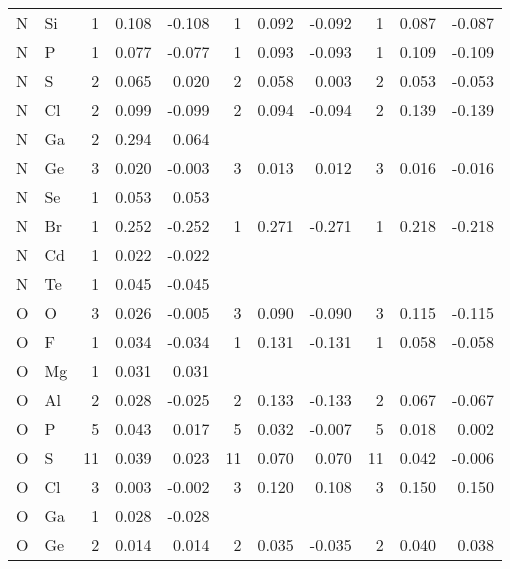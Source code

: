 \begin{table}
\begin{center}
\begin{tabular}{llrrrrrrrrr}
  N &  Si &   1 &    0.108 &   -0.108 &   1 &    0.092 &   -0.092 &   1 &    0.087 &   -0.087 \\
  N &   P &   1 &    0.077 &   -0.077 &   1 &    0.093 &   -0.093 &   1 &    0.109 &   -0.109 \\
  N &   S &   2 &    0.065 &    0.020 &   2 &    0.058 &    0.003 &   2 &    0.053 &   -0.053 \\
  N &  Cl &   2 &    0.099 &   -0.099 &   2 &    0.094 &   -0.094 &   2 &    0.139 &   -0.139 \\
  N &  Ga &   2 &    0.294 &    0.064 &     &          &          &     &          &          \\
  N &  Ge &   3 &    0.020 &   -0.003 &   3 &    0.013 &    0.012 &   3 &    0.016 &   -0.016 \\
  N &  Se &   1 &    0.053 &    0.053 &     &          &          &     &          &          \\
  N &  Br &   1 &    0.252 &   -0.252 &   1 &    0.271 &   -0.271 &   1 &    0.218 &   -0.218 \\
  N &  Cd &   1 &    0.022 &   -0.022 &     &          &          &     &          &          \\
  N &  Te &   1 &    0.045 &   -0.045 &     &          &          &     &          &          \\
  O &   O &   3 &    0.026 &   -0.005 &   3 &    0.090 &   -0.090 &   3 &    0.115 &   -0.115 \\
  O &   F &   1 &    0.034 &   -0.034 &   1 &    0.131 &   -0.131 &   1 &    0.058 &   -0.058 \\
  O &  Mg &   1 &    0.031 &    0.031 &     &          &          &     &          &          \\
  O &  Al &   2 &    0.028 &   -0.025 &   2 &    0.133 &   -0.133 &   2 &    0.067 &   -0.067 \\
  O &   P &   5 &    0.043 &    0.017 &   5 &    0.032 &   -0.007 &   5 &    0.018 &    0.002 \\
  O &   S &  11 &    0.039 &    0.023 &  11 &    0.070 &    0.070 &  11 &    0.042 &   -0.006 \\
  O &  Cl &   3 &    0.003 &   -0.002 &   3 &    0.120 &    0.108 &   3 &    0.150 &    0.150 \\
  O &  Ga &   1 &    0.028 &   -0.028 &     &          &          &     &          &          \\
  O &  Ge &   2 &    0.014 &    0.014 &   2 &    0.035 &   -0.035 &   2 &    0.040 &    0.038 \\

\end{tabular}
\end{center}
\end{table}
